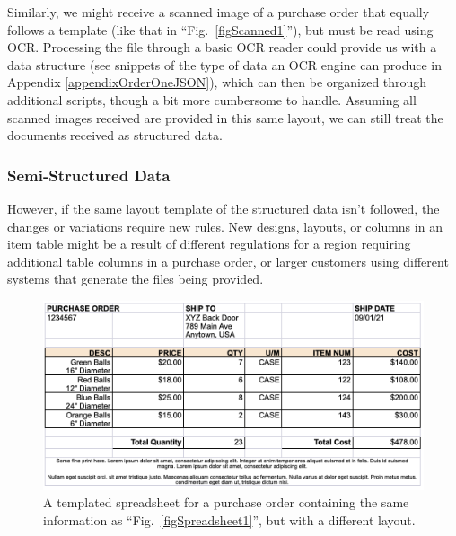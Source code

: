 \documentclass[conference]{IEEEtran}
\begin{document}
Similarly, we might receive a scanned image of a purchase order that equally follows a template (like that in ``Fig.~\ref{figScanned1}''), but must be read using OCR. Processing the file through a basic OCR reader could provide us with a data structure (see snippets of the type of data an OCR engine can produce in Appendix \ref{appendixOrderOneJSON}), which can then be organized through additional scripts, though a bit more cumbersome to handle. Assuming all scanned images received are provided in this same layout, we can still treat the documents received as structured data.

\subsubsection{Semi-Structured Data}
However, if the same layout template of the structured data isn't followed, the changes or variations require new rules. New designs, layouts, or columns in an item table might be a result of different regulations for a region requiring additional table columns in a purchase order, or larger customers using different systems that generate the files being provided.

\begin{figure}[ht]
\centerline{\includegraphics[width=\columnwidth]{Spreadsheet2.png}}
\caption{A templated spreadsheet for a purchase order containing the same information as ``Fig.~\ref{figSpreadsheet1}'', but with a different layout.}
\label{figSpreadsheet2}
\end{figure}
\end{document}
